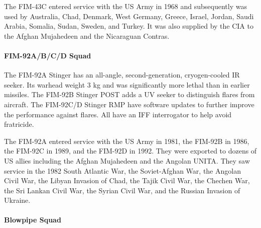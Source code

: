 The FIM-43C entered service with the US Army in 1968 and subsequently was used by Australia, Chad, Denmark, West Germany, Greece, Israel, Jordan, Saudi Arabia, Somalia, Sudan, Sweden, and Turkey. It was also supplied by the CIA to the Afghan Mujahedeen and the Nicaraguan Contras.

\paragraph{FIM-92A/B/C/D Squad}

The FIM-92A Stinger has an all-angle, second-generation, cryogen-cooled IR seeker.
Its warhead weight 3 kg and was significantly more lethal than in earlier missiles.
The FIM-92B Stinger POST adds a UV seeker to distinguish flares from aircraft.
The FIM-92C/D Stinger RMP have software updates to further improve the performance against flares.
All have an IFF interrogator to help avoid fratricide.%

The FIM-92A entered service with the US Army in 1981, the FIM-92B in 1986, the FIM-92C in 1989, and the FIM-92D in 1992. They were exported to dozens of US allies including the Afghan Mujahedeen and the Angolan UNITA. They saw service in the 1982 South Atlantic War, the Soviet-Afghan War, the Angolan Civil War, the Libyan Invasion of Chad, the Tajik Civil War, the Chechen War, the Sri Lankan Civil War, the Syrian Civil War, and the Russian Invasion of Ukraine.

\paragraph{Blowpipe Squad}

